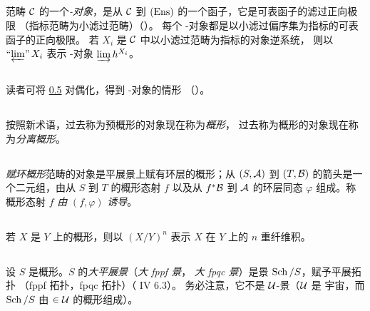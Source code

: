 \subsection{}
范畴 ${\mathcal C}$ 的一个\pageoriginale \emph{\ppro-对象}，是从
${\mathcal C}$ 到 $(\operatorname{Ens})$ 的一个函子，它是可表函子的滤过正向极限
（指标范畴为小滤过范畴）（\cf {}）。
每个 \ppro-对象都是以小滤过偏序集为指标的可表函子的正向极限。
若 $X_{i}$ 是 ${\mathcal C}$ 中以小滤过范畴为指标的对象逆系统，
则以 $\operatorname*{\text{``$\varprojlim$''}} X_{i}$ 表示 \ppro-对象 $\varinjlim h^{X_i}$。

\subsection{}
读者可将 \hyperref[XVII.subsec0.5]{0.5} 对偶化，得到 \iind-对象的情形
（\Cf {}）。

\subsection{}
按照新术语，过去称为预概形的对象现在称为\emph{概形}，
过去称为概形的对象现在称为\emph{分离概形}。

\subsection{}
\emph{赋环概形}范畴的对象是平展景上赋有环层的概形；从 $(S,{\mathcal A})$ 到 $(T,{\mathcal B})$
的箭头是一个二元组，由从 $S$ 到 $T$ 的概形态射 $f$ 以及从 $f^{\ast}{\mathcal B}$
到 ${\mathcal A}$ 的环层同态 $\varphi$ 组成。称概形态射 $f$ \emph{由} $(f,\varphi)$ \emph{诱导}。

\subsection{}
若 $X$ 是 $Y$ 上的概形，则以 $(X/Y)^n$ 表示 $X$ 在 $Y$ 上的 $n$ 重纤维积。

\subsection{}
设 $S$ 是概形。$S$ 的\emph{大平展景}（\resp \emph{大 fppf 景}，
\resp \emph{大 fpqc 景}）是景 $\operatorname{Sch}/{S}$，赋予平展拓扑
（\resp fppf 拓扑，\resp fpqc 拓扑）（ IV 6.3）。
务必注意，它不是 ${\mathcal U}$-景（${\mathcal U}$ 是
宇宙，而 $\operatorname{Sch}/{S}$ 由 $\in {\mathcal U}$ 的概形组成）。

